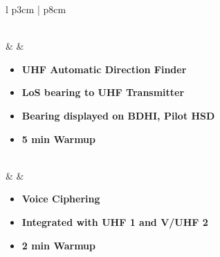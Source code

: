 \documentclass[fontHelvetica]{TechCheck}
\begin{document}
\begin{center}
\begin{longtable}{l p{3cm} | p{8cm}}
\begin{minipage}[t]{\linewidth}
\begin{itemize}
\begin{itemize}
					\end{itemize}
				\end{itemize}
			\end{minipage} \\
			\midrule
			\textbf{\textbullet} &   &
			\begin{minipage}[t]{\linewidth}
				\vspace{-7pt}
				\begin{itemize}
					\item \textbf{UHF Automatic Direction Finder}
					\item \textbf{LoS bearing to UHF Transmitter}
					\item \textbf{Bearing displayed on BDHI, Pilot HSD}
					\item \textbf{5 min Warmup}
				\end{itemize}
			\end{minipage} \\
			\midrule
			\textbf{\textbullet} &   &
			\begin{minipage}[t]{\linewidth}
				\vspace{-7pt}
				\begin{itemize}
					\item \textbf{Voice Ciphering}
					\item \textbf{Integrated with UHF 1 and V/UHF 2}
					\item \textbf{2 min Warmup}
				\end{itemize}
			\end{minipage} \\
			\bottomrule
		\end{longtable}
	\end{center}
\end{document}
